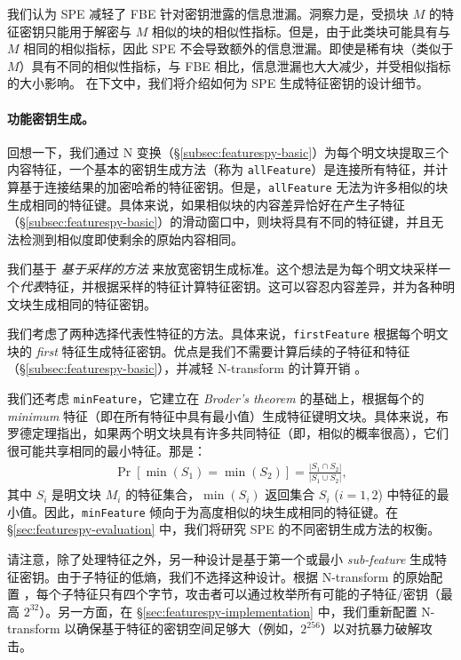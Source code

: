 我们认为 SPE 减轻了 FBE 针对密钥泄露的信息泄漏。洞察力是，受损块 $M$ 的特征密钥只能用于解密与 $M$ 相似的块的相似性指标。但是，由于此类块可能具有与 $M$ 相同的相似指标，因此 SPE 不会导致额外的信息泄漏。即使是稀有块（类似于 $M$）具有不同的相似性指标，与 FBE 相比，信息泄漏也大大减少，并受相似指标的大小影响。
在下文中，我们将介绍如何为 SPE 生成特征密钥的设计细节。


\paragraph*{功能密钥生成。}
回想一下，我们通过 N 变换（\S\ref{subsec:featurespy-basic}）为每个明文块提取三个内容特征，一个基本的密钥生成方法（称为 {\tt allFeature}）是连接所有特征，并计算基于连接结果的加密哈希的特征密钥。但是，{\tt allFeature} 无法为许多相似的块生成相同的特征键。具体来说，如果相似块的内容差异恰好在产生子特征（\S\ref{subsec:featurespy-basic}）的滑动窗口中，则块将具有不同的特征键，并且无法检测到相似度即使剩余的原始内容相同。

我们基于 {\em 基于采样的方法} \cite{bhagwat09, dong11, qin17} 来放宽密钥生成标准。这个想法是为每个明文块采样一个{\em 代表}特征，并根据采样的特征计算特征密钥。这可以容忍内容差异，并为各种明文块生成相同的特征密钥。

我们考虑了两种选择代表性特征的方法。具体来说，{\tt firstFeature} 根据每个明文块的 {\em first} 特征生成特征密钥。优点是我们不需要计算后续的子特征和特征（\S\ref{subsec:featurespy-basic}），并减轻 N-transform 的计算开销 \cite{zhang19}。

我们还考虑 {\tt minFeature}，它建立在 {\em Broder's theorem} \cite{broder97} 的基础上，根据每个的 {\em minimum} 特征（即在所有特征中具有最小值）生成特征键明文块。具体来说，布罗德定理指出，如果两个明文块具有许多共同特征（即，相似的概率很高），它们很可能共享相同的最小特征。那是：
\begin{eqnarray}
  \label{eq:featurespy-broder}
 \Pr[\min(S_1) = \min(S_2)] = \frac{|S_1 \cap S_2|}{|S_1 \cup S_2|},
\end{eqnarray}
其中 $S_i$ 是明文块 $M_i$ 的特征集合，$\min(S_i)$ 返回集合 $S_i$ ($i = 1, 2$) 中特征的最小值。因此，{\tt minFeature} 倾向于为高度相似的块生成相同的特征键。在 \S\ref{sec:featurespy-evaluation} 中，我们将研究 SPE 的不同密钥生成方法的权衡。

请注意，除了处理特征之外，另一种设计是基于第一个或最小 {\em sub-feature} 生成特征密钥。由于子特征的低熵，我们不选择这种设计。根据 N-transform 的原始配置 \cite{shilane12}，每个子特征只有四个字节，攻击者可以通过枚举所有可能的子特征/密钥（最高 $2^{ 32}$）。另一方面，在 \S\ref{sec:featurespy-implementation} 中，我们重新配置 N-transform 以确保基于特征的密钥空间足够大（例如，$2^{256}$）以对抗暴力破解攻击。


